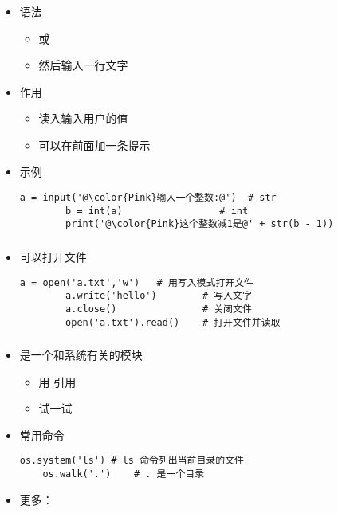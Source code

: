 \begin{frame} [fragile]
	\frametitle{}
	\linespread{1.25}
	\begin{itemize}
	\item 语法
		\begin{itemize}
		\item {} 或 
		\item 然后输入一行文字
		\end{itemize}
	\item 作用
		\begin{itemize}
		\item 读入输入用户的值
		\item 可以在前面加一条提示
		\end{itemize}
	\item 示例
		\begin{lstlisting}[style=pythonstyle, gobble=8, texcl, escapechar=@]
		a = input('@\color{Pink}输入一个整数:@')	# str
		b = int(a)				   # int
		print('@\color{Pink}这个整数减1是@' + str(b - 1))
		\end{lstlisting}
	\end{itemize}
\end{frame}

\begin{frame} [fragile]
	\frametitle{}
	\linespread{1.25}
	\begin{itemize}
	\item {}可以打开文件
		\begin{lstlisting}[style=pythonstyle, gobble=8, texcl]
		a = open('a.txt','w')	# 用写入模式打开文件
		a.write('hello')		# 写入文字
		a.close()				# 关闭文件
		open('a.txt').read()	# 打开文件并读取
		\end{lstlisting}
	\end{itemize}
\end{frame}

\begin{frame} [fragile]
	\frametitle{}
	\linespread{1.25}
	\begin{itemize}
	\item {}是一个和系统有关的模块
		\begin{itemize}
		\item 用  引用
		\item 试一试 
		\end{itemize}
	\item 常用命令
	\begin{lstlisting}[style=pythonstyle, gobble=4, texcl]
	os.system('ls')	# ls 命令列出当前目录的文件
	os.walk('.')	# . 是一个目录
	\end{lstlisting}
	\item 更多：
	\end{itemize}
\end{frame}

